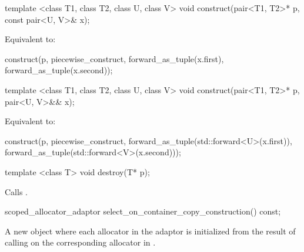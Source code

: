 %
\begin{itemdecl}
template <class T1, class T2, class U, class V>
  void construct(pair<T1, T2>* p, const pair<U, V>& x);
\end{itemdecl}

\begin{itemdescr}
\pnum
\effects Equivalent to:
\begin{codeblock}
construct(p, piecewise_construct,
          forward_as_tuple(x.first),
          forward_as_tuple(x.second));
\end{codeblock}
\end{itemdescr}

%
\begin{itemdecl}
template <class T1, class T2, class U, class V>
  void construct(pair<T1, T2>* p, pair<U, V>&& x);
\end{itemdecl}

\begin{itemdescr}
\pnum
\effects Equivalent to:
\begin{codeblock}
construct(p, piecewise_construct,
          forward_as_tuple(std::forward<U>(x.first)),
          forward_as_tuple(std::forward<V>(x.second)));
\end{codeblock}
\end{itemdescr}

%
\begin{itemdecl}
template <class T>
  void destroy(T* p);
\end{itemdecl}

\begin{itemdescr}
\pnum
\effects Calls .
\end{itemdescr}

%
\begin{itemdecl}
scoped_allocator_adaptor select_on_container_copy_construction() const;
\end{itemdecl}

\begin{itemdescr}
\pnum
\returns A new  object where each allocator  in the
adaptor is initialized from the result of calling
 on the
corresponding allocator in .
\end{itemdescr}

